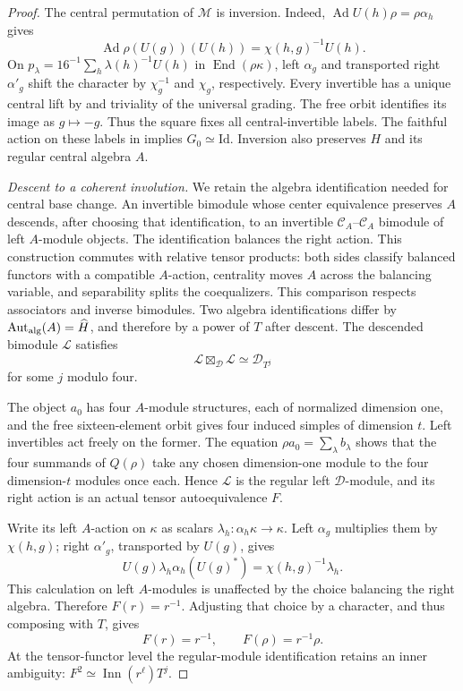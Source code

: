 \begin{proof}
The central permutation of $\mathcal M$ is inversion. Indeed,
$\operatorname{Ad}U(h)\rho=\rho\alpha_h$ gives
\[
 \operatorname{Ad}\rho(U(g))(U(h))=\chi(h,g)^{-1}U(h).
\]
On $p_\lambda=16^{-1}\sum_h\lambda(h)^{-1}U(h)$ in
$\operatorname{End}(\rho\kappa)$, left $\alpha_g$ and transported
right $\alpha'_g$ shift the character by $\chi_g^{-1}$ and
$\chi_g$, respectively. Every invertible has a unique central lift
by \cite[Theorem~13.4]{IzumiNear} and triviality of the universal
grading. The free orbit identifies its image as $g\mapsto-g$.
Thus the square fixes all central-invertible labels.
The faithful action on these labels in
\cite[Corollary~13.5]{IzumiNear} implies $G_0\simeq\mathrm{Id}$.
Inversion also preserves $H$ and its regular central algebra $A$.

\emph{Descent to a coherent involution.}
We retain the algebra identification needed for central base change.
An invertible bimodule whose center equivalence preserves $A$ descends,
after choosing that identification, to an invertible
$\mathcal C_A$--$\mathcal C_A$ bimodule of left $A$-module objects.
The identification balances the right action. This construction commutes
with relative tensor products: both sides classify balanced functors
with a compatible $A$-action, centrality moves $A$ across the balancing
variable, and separability splits the coequalizers. This comparison
respects associators and inverse bimodules.
Two algebra identifications differ by
$\operatorname{Aut}_{\rm alg}(A)=\widehat H$, and therefore by a
power of $T$ after descent. The descended bimodule $\mathcal L$ satisfies
\[
 \mathcal L\boxtimes_{\mathcal D}\mathcal L
 \simeq\mathcal D_{T^j}
\]
for some $j$ modulo four.

The object $a_0$ has four $A$-module structures, each of normalized
dimension one, and the free sixteen-element orbit gives four induced
simples of dimension $t$. Left invertibles act freely on the former.
The equation $\rho a_0=\sum_\lambda b_\lambda$ shows that the four
summands of $Q(\rho)$ take any chosen dimension-one module to the four
dimension-$t$ modules once each. Hence $\mathcal L$ is the regular
left $\mathcal D$-module, and its right action is an actual tensor
autoequivalence $F$.

Write its left $A$-action on $\kappa$ as scalars
$\lambda_h:\alpha_h\kappa\to\kappa$. Left $\alpha_g$ multiplies
them by $\chi(h,g)$; right $\alpha'_g$, transported by $U(g)$, gives
\[
 U(g)\lambda_h\alpha_h(U(g)^*)=\chi(h,g)^{-1}\lambda_h.
\]
This calculation on left $A$-modules is unaffected by the choice
balancing the right algebra. Therefore $F(r)=r^{-1}$. Adjusting that
choice by a character, and thus composing with $T$, gives
\begin{equation}\label{eq:inversion-F}
 F(r)=r^{-1},\qquad F(\rho)=r^{-1}\rho.
\end{equation}
At the tensor-functor level the regular-module identification retains
an inner ambiguity:
$F^2\simeq\operatorname{Inn}(r^\ell)T^j$.


\end{proof}
